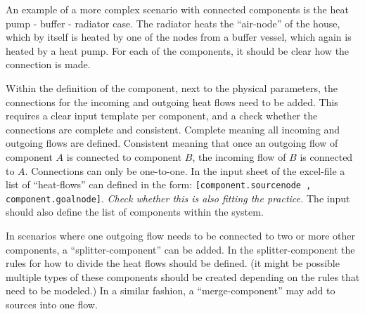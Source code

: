 An example of a more complex scenario with connected components is the heat pump - buffer - radiator case. The radiator heats the "`air-node"' of the house, which by itself is heated by one of the nodes from a buffer vessel, which again is heated by a heat pump. 
For each of the components, it should be clear how the connection is made. 

Within the definition of the component, next to the physical parameters, the connections for the incoming and outgoing heat flows need to be added. This requires a clear input template per component, and a check whether the connections are complete and consistent. Complete meaning all incoming and outgoing flows are defined. Consistent meaning that once an outgoing flow of component $A$ is connected to component $B$, the incoming flow of $B$ is connected to $A$. Connections can only be one-to-one. In the input sheet of the excel-file a list of "`heat-flows"' can defined in the form: \texttt{[component.sourcenode , component.goalnode]}. \emph{Check whether this is also fitting the practice.} The input should also define the list of components within the system. 

In scenarios where one outgoing flow needs to be connected to two or more other components, a "`splitter-component"' can be added. In the splitter-component the rules for how to divide the heat flows should be defined. (it might be possible multiple types of these components should be created depending on the rules that need to be modeled.) In a similar fashion, a "`merge-component"' may add to sources into one flow. 





   









%
\printbibliography[heading=bibintoc]









